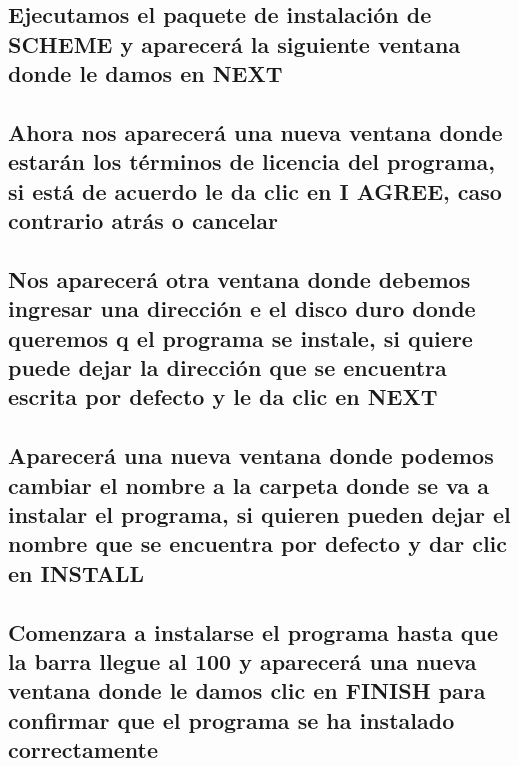 \documentclass[11pt]{article} %
\begin{document}
\subsection{Ejecutamos el paquete de instalación de SCHEME y aparecerá la siguiente ventana donde le damos en NEXT}
\begin{center}
\end{center}

\subsection{Ahora nos aparecerá una nueva ventana donde estarán los términos de licencia del programa, si está de acuerdo le da clic en  I AGREE, caso contrario atrás o cancelar}
\begin{center}
\end{center}

\subsection{Nos aparecerá otra ventana donde debemos ingresar una dirección e el disco duro donde queremos q el programa se instale, si quiere puede dejar la dirección que se encuentra escrita por defecto y le da clic en NEXT}
\begin{center}
\end{center}

\subsection{Aparecerá una nueva ventana donde podemos cambiar el nombre a la carpeta donde se va a instalar el programa, si quieren pueden dejar el nombre que se encuentra por defecto y dar clic en  INSTALL }
\begin{center}
\end{center}

\subsection{Comenzara a instalarse el programa hasta que la barra llegue al 100 y aparecerá una nueva ventana donde le damos clic en FINISH para confirmar que el programa se ha instalado correctamente}
\begin{center}
\end{center}
\end{document}
